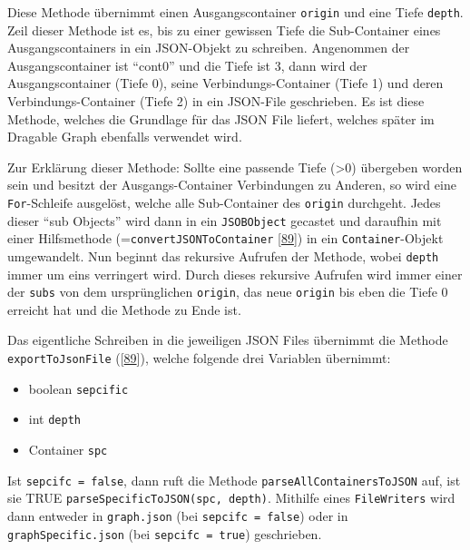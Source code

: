 \documentclass[
    headings=optiontotocandhead,%
    twoside,
    numbers=noenddot,%
    12pt, %
    titlepage, %
    parskip=full, %
    listof=leveldown, 
    numbers=noenddot, %
    a4paper,DIV=14,
    BCOR=15mm,
]{scrbook}
\newcommand{\passthrough}[1]{#1}
\providecommand{\tightlist}{%
  \setlength{\itemsep}{0pt}\setlength{\parskip}{0pt}}
\begin{document}
Diese Methode übernimmt einen Ausgangscontainer
\passthrough{\lstinline!origin!} und eine Tiefe
\passthrough{\lstinline!depth!}. Zeil dieser Methode ist es, bis zu
einer gewissen Tiefe die Sub-Container eines Ausgangscontainers in ein
JSON-Objekt zu schreiben. Angenommen der Ausgangscontainer ist ``cont0''
und die Tiefe ist 3, dann wird der Ausgangscontainer (Tiefe 0), seine
Verbindungs-Container (Tiefe 1) und deren Verbindungs-Container (Tiefe
2) in ein JSON-File geschrieben. Es ist diese Methode, welches die
Grundlage für das JSON File liefert, welches später im Dragable Graph
ebenfalls verwendet wird.

Zur Erklärung dieser Methode: Sollte eine passende Tiefe (\textgreater0)
übergeben worden sein und besitzt der Ausgangs-Container Verbindungen zu
Anderen, so wird eine \passthrough{\lstinline!For!}-Schleife ausgelöst,
welche alle Sub-Container des \passthrough{\lstinline!origin!}
durchgeht. Jedes dieser ``sub Objects'' wird dann in ein
\passthrough{\lstinline!JSOBObject!} gecastet und daraufhin mit einer
Hilfsmethode (=\passthrough{\lstinline!convertJSONToContainer!}
{[}\protect\hyperlink{ref-gpt-SpecificJson}{89}{]}) in ein
\passthrough{\lstinline!Container!}-Objekt umgewandelt. Nun beginnt das
rekursive Aufrufen der Methode, wobei \passthrough{\lstinline!depth!}
immer um eins verringert wird. Durch dieses rekursive Aufrufen wird
immer einer der \passthrough{\lstinline!subs!} von dem ursprünglichen
\passthrough{\lstinline!origin!}, das neue
\passthrough{\lstinline!origin!} bis eben die Tiefe 0 erreicht hat und
die Methode zu Ende ist.

Das eigentliche Schreiben in die jeweiligen JSON Files übernimmt die
Methode \passthrough{\lstinline!exportToJsonFile!}
({[}\protect\hyperlink{ref-gpt-SpecificJson}{89}{]}), welche folgende
drei Variablen übernimmt:

\begin{itemize}
\tightlist
\item
  boolean \passthrough{\lstinline!sepcific!}
\item
  int \passthrough{\lstinline!depth!}
\item
  Container \passthrough{\lstinline!spc!}
\end{itemize}

Ist \passthrough{\lstinline!sepcifc = false!}, dann ruft die Methode
\passthrough{\lstinline!parseAllContainersToJSON!} auf, ist sie TRUE
\passthrough{\lstinline!parseSpecificToJSON(spc, depth)!}. Mithilfe
eines \passthrough{\lstinline!FileWriters!} wird dann entweder in
\passthrough{\lstinline!graph.json!} (bei
\passthrough{\lstinline!sepcifc = false!}) oder in
\passthrough{\lstinline!graphSpecific.json!} (bei
\passthrough{\lstinline!sepcifc = true!}) geschrieben.
\end{document}
